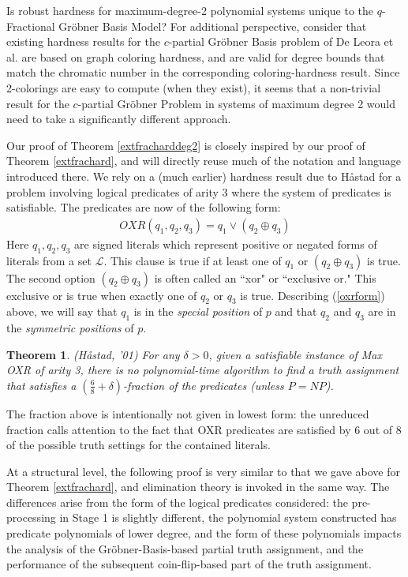 \documentclass{article}
\newtheorem{theorem}{Theorem}[]
\begin{document}
Is robust hardness for maximum-degree-2 polynomial systems unique to the $q$-Fractional Gr\"{o}bner Basis Model? For additional perspective, consider that existing hardness results for the $c$-partial Gr\"{o}bner Basis problem of De Leora et al. are based on graph coloring hardness, and are valid for degree bounds that match the chromatic number in the corresponding coloring-hardness result. Since 2-colorings are easy to compute (when they exist), it seems that a non-trivial result for the $c$-partial Gr\"{o}bner Problem in systems of maximum degree 2 would need to take a significantly different approach. 

Our proof of Theorem \ref{extfracharddeg2} is closely inspired by our proof of Theorem \ref{extfrachard}, and will directly reuse much of the notation and language introduced there.  We rely on a (much earlier) hardness result due to H{\aa}stad for a problem involving logical predicates of arity 3 where the system of predicates is satisfiable.  The predicates are now of the following form:
\vspace{-5mm}
\begin{align}\label{oxrform}
OXR(q_1,q_2,q_3)=q_1 \vee (q_2 \oplus q_3)
\end{align}
Here $q_1,q_2,q_3$ are signed literals which represent positive or negated forms of literals from a set $\mathcal{L}$. This clause is true if at least one of $q_1$ or $(q_2 \oplus q_3)$ is true.  The second option $(q_2 \oplus q_3)$ is often called an ``xor" or ``exclusive or." This exclusive or is true when exactly one of $q_2$ or $q_3$ is true. Describing (\ref{oxrform}) above, we will say that $q_1$ is in the \textit{special position} of $p$ and that $q_2$ and $q_3$ are in the \textit{symmetric positions} of $p$. 

\begin{theorem} \label{hastad2}(H{\aa}stad, '01)
For any $\delta>0$, given a satisfiable instance of Max OXR of arity 3, there is no polynomial-time algorithm to find a truth assignment that satisfies a $(\frac{6}{8}+\delta)$-fraction of the predicates (unless $P=NP$). 
\end{theorem}

The fraction above is intentionally not given in lowest form: the unreduced fraction calls attention to the fact that OXR predicates are satisfied by 6 out of 8 of the possible truth settings for the contained literals.

At a structural level, the following proof is very similar to that we gave above for Theorem \ref{extfrachard}, and elimination theory is invoked in the same way.  The differences arise from the form of the logical predicates considered: the pre-processing in Stage 1 is slightly different, the polynomial system constructed has predicate polynomials of lower degree, and the form of these polynomials impacts the analysis of the Gr\"{o}bner-Basis-based partial truth assignment, and the performance of the subsequent coin-flip-based part of the truth assignment.\\
\end{document}
